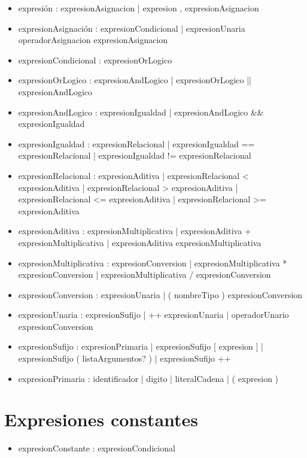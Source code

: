 \begin{itemize}
\item expresi\'on : expresionAsignacion | expresion , expresionAsignacion
\item expresionAsignaci\'on : expresionCondicional | expresionUnaria operadorAsignacion expresionAsignacion
\item expresionCondicional : expresionOrLogico
\item expresionOrLogico : expresionAndLogico | expresionOrLogico || expresionAndLogico
\item expresionAndLogico : expresionIgualdad | expresionAndLogico \&\& expresionIgualdad
\item expresionIgualdad : expresionRelacional | expresionIgualdad == expresionRelacional | expresionIgualdad != expresionRelacional
\item expresionRelacional : expresionAditiva | expresionRelacional < expresionAditiva |  expresionRelacional > expresionAditiva | expresionRelacional <= expresionAditiva | expresionRelacional >= expresionAditiva
\item expresionAditiva : expresionMultiplicativa | expresionAditiva + expresionMultiplicativa | expresionAditiva \- expresionMultiplicativa
\item expresionMultiplicativa : expresionConversion | expresionMultiplicativa * expresionConversion | expresionMultiplicativa / expresionConversion
\item expresionConversion : expresionUnaria | ( nombreTipo ) expresionConversion
\item expresionUnaria : expresionSufijo | ++ expresionUnaria | operadorUnario expresionConversion
\item expresionSufijo : expresionPrimaria | expresionSufijo [ expresion ] | expresionSufijo ( listaArgumentos? ) | expresionSufijo ++
\item expresionPrimaria : identificador | digito | literalCadena | ( expresion )
\end{itemize}

\section{Expresiones constantes}

\begin{itemize}
\item expresionConstante : expresionCondicional
\end{itemize}

